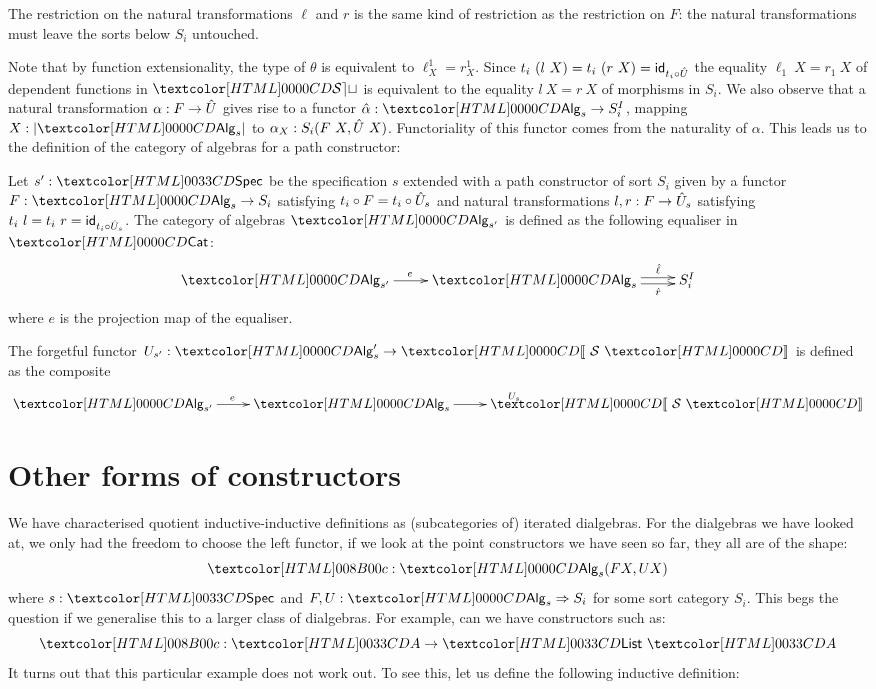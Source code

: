 The restriction on the natural transformations $\ell$ and $r$ is the
same kind of restriction as the restriction on $F$: the natural
transformations must leave the sorts below $S_i$ untouched.

Note that by function extensionality, the type of $\theta$ is
equivalent to $\ell^1_X = r^1_X$. Since
$t_i\ (l\ X) = t_i\ (r\ X) = \id_{t_i \circ \extendfunc{U}}$ the equality
$\ell_1\ X = r_1\ X$ of dependent functions in $\SET$ is equivalent to
the equality $l\ X = r\ X $ of morphisms in $S_i$. We also observe
that a natural transformation $\alpha : F \to \hat{U}$ gives rise to a
functor $\hat{\alpha} : \Alg_s \to S_i^I$, mapping $X : | \Alg_s |$ to
$\alpha_X : S_i(F\ X,\extendfunc{U}\ X)$. Functoriality of this functor comes
from the naturality of $\alpha$. This leads us to the definition of
the category of algebras for a path constructor:

\begin{definition}
  Let $s' : \specty$ be the specification
  $s$ extended with a path constructor of sort
  $S_i$ given by a functor $F : \Alg_s \to S_i$ satisfying $t_i \circ
  F = t_i \circ \hat{U}_s$ and natural transformations $l, r : F \to
  \hat{U}_s$ satisfying $t_i\ l = t_i\ r = \id_{t_i \circ
    \extendfunc{U}_s}$. The category of algebras
  $\Alg_{s'}$ is defined as the following equaliser in $\Cat$:
  \[
  \xymatrix{
    \Alg_{s'} \ar[r]^{e} &\Alg_s \ar@<-.5ex>[r]_-{\hat{r}} \ar@<.5ex>[r]^-{\hat{\ell}} &S_i^I
  }
  \]
  where $e$ is the projection map of the equaliser.

The forgetful functor $U_{s'} : \Alg_s' \to \SortCat{\Ss}$ is defined as the composite
\[
\xymatrix{
    \Alg_{s'} \ar[r]^{e} &\Alg_s \ar[r]^{U_s} &\SortCat{\Ss}
}
\]
\end{definition}

\section{Other forms of constructors}
\label{other-forms-of-constructors}

We have characterised quotient inductive-inductive definitions as
(subcategories of) iterated dialgebras. For the dialgebras we have
looked at, we only had the freedom to choose the left functor, \ie if
we look at the point constructors we have seen so far, they all are of
the shape:
$$
\Ac : \Alg_s(F X , U X)
$$
where $s : \specty$ and $F, U : \Func{\Alg_s}{S_i}$ for some sort
category $S_i$. This begs the question if we generalise this to a
larger class of dialgebras. For example, can we have constructors such
as:
$$
\Ac : \Aty \to \List\ \Aty
$$
It turns out that this particular example does not work out. To see
this, let us define the following inductive definition:
\begin{datatype}{\Aty}{\Set}
  \constr{\Aco}{\Aty} \\
  \constr{\Aci}{\Aty \to \List\ \Aty}
\end{datatype}

